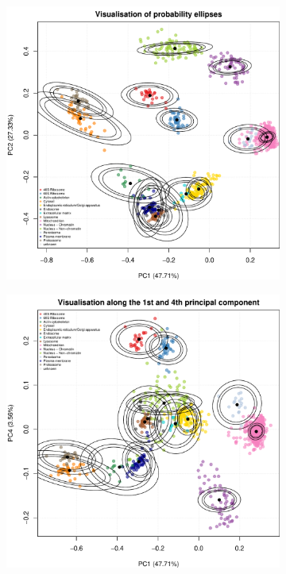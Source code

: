 \documentclass[12pt,english]{article}\usepackage[]{graphicx}\usepackage[]{color}
\makeatletter
\def\maxwidth{ %
  \ifdim\Gin@nat@width>\linewidth
    \linewidth
  \else
    \Gin@nat@width
  \fi
}
\newenvironment{knitrout}{}{} %
\makeatother
\begin{document}
\begin{figure}[p]
  \begin{subfigure}[t]{0.45\textwidth}
        \centering
\begin{knitrout}
\color{fgcolor}
\includegraphics[width=\maxwidth]{figure/pca12-ellipses-1} 

\end{knitrout}
        \caption{}
\end{subfigure}%
\hfill
\begin{subfigure}[t]{0.45\textwidth}
\begin{knitrout}
\color{fgcolor}
\includegraphics[width=\maxwidth]{figure/pca14-ellipses-1} 


\end{knitrout}
\end{subfigure}
\end{figure}
\end{document}
